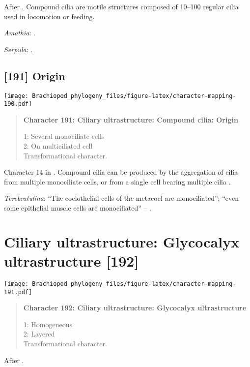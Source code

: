\documentclass[openany]{book}
\theoremstyle{definition}
\theoremstyle{definition}
\theoremstyle{definition}
\theoremstyle{remark}
\begin{document}
After \citet{Lundin2009}. Compound cilia are motile structures composed
of 10--100 regular cilia used in locomotion or feeding.

\hypertarget{Amathia-coding-190}{}
\emph{Amathia}: \citet{Reed1982}.

\hypertarget{Serpula-coding-190}{}
\emph{Serpula}: \citet{Nielsen1987}.

\subsection*{{[}191{]} Origin}\label{origin-1}

\texttt{[image: Brachiopod\_phylogeny\_files/figure-latex/character-mapping-190.pdf]}

\begin{quote}
\textbf{Character 191: Ciliary ultrastructure: Compound cilia: Origin}

1: Several monociliate cells\\
2: On multiciliated cell\\
Transformational character.
\end{quote}

Character 14 in \citet{Glenner2004}. Compound cilia can be produced by
the aggregation of cilia from multiple monociliate cells, or from a
single cell bearing multiple cilia \citep{Nielsen1987}.

\hypertarget{Terebratulina-coding-191}{}
\emph{Terebratulina}: ``The coelothelial cells of the metacoel are
monociliated''; ``even some epithelial muscle cells are monociliated''
-- \citet{Luter1995}.

\section{Ciliary ultrastructure: Glycocalyx ultrastructure
{[}192{]}}\label{ciliary-ultrastructure-glycocalyx-ultrastructure-192}

\texttt{[image: Brachiopod\_phylogeny\_files/figure-latex/character-mapping-191.pdf]}

\begin{quote}
\textbf{Character 192: Ciliary ultrastructure: Glycocalyx
ultrastructure}

1: Homogeneous\\
2: Layered\\
Transformational character.
\end{quote}

After \citet{Lundin2009}.
\end{document}
